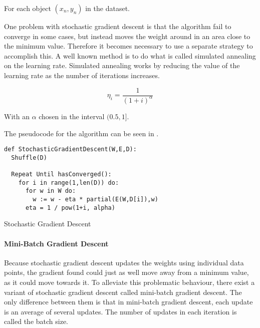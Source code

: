 For each object $(x_n, y_n)$ in the dataset.

One problem with stochastic gradient descent is that the algorithm fail to converge in some cases, but instead moves the weight around in an area close to the minimum value.
Therefore it becomes necessary to use a separate strategy to accomplish this.
A well known method is to do what is called simulated annealing on the learning rate.
Simulated annealing works by reducing the value of the learning rate as the number of iterations increases.

$$\eta_i = \frac{1}{(1+i)^\alpha}$$

With an $\alpha$ chosen in the interval $(0.5,1]$. 


The pseudocode for the algorithm can be seen in .
\begin{listing}[H]
\begin{verbatim}
def StochasticGradientDescent(W,E,D):
  Shuffle(D)

  Repeat Until hasConverged():
    for i in range(1,len(D)) do:
      for w in W do: 
        w := w - eta * partial(E(W,D[i]),w)
      eta = 1 / pow(1+i, alpha)

\end{verbatim}
\caption{Stochastic Gradient Descent}
\label{lst:sgt}
\end{listing}

\paragraph{Mini-Batch Gradient Descent}\label{sec:mini-batch}
Because stochastic gradient descent updates the weights using individual data points, the gradient found could just as well move away from a minimum value, as it could move towards it. 
To alleviate this problematic behaviour, there exist a variant of stochastic gradient descent called mini-batch gradient descent. 
The only difference between them is that in mini-batch gradient descent, each update is an average of several updates.
The number of updates in each iteration is called the batch size.








